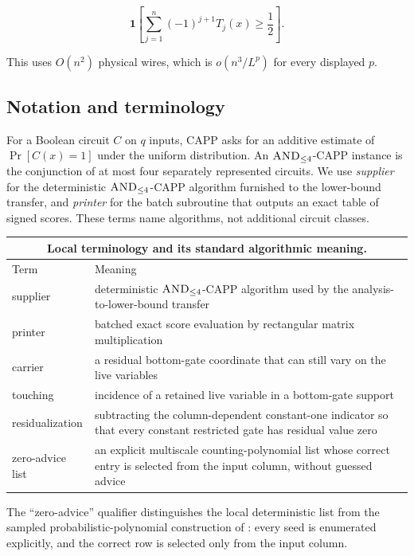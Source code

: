 \documentclass[11pt,letterpaper]{article}
\theoremstyle{definition}
\theoremstyle{remark}
\newcommand{\CAPP}{\textsc{CAPP}}
\newcommand{\ANDfour}{\textsc{AND}_{\le 4}}
\begin{document}
\[
\mathbf1\left[
\sum_{j=1}^n(-1)^{j+1}T_j(x)
\ge\frac12
\right].
\]

This uses \(O(n^2)\) physical wires, which is \(o(n^3/L^p)\) for every
displayed \(p\).

\subsection{Notation and terminology}\label{sec:notation}

For a Boolean circuit \(C\) on \(q\) inputs, \CAPP{} asks for an additive
estimate of \(\Pr[C(x)=1]\) under the uniform distribution. An
\(\ANDfour\)-\CAPP{} instance is the conjunction of at most four separately
represented circuits. We use \emph{supplier} for the deterministic
\(\ANDfour\)-\CAPP{} algorithm furnished to the lower-bound transfer, and
\emph{printer} for the batch subroutine that outputs an exact table of signed
scores. These terms name algorithms, not additional circuit classes.

\begin{center}
\small
\begin{tabularx}{\textwidth}{@{}p{}X@{}}
\multicolumn{2}{c}{\textbf{Local terminology and its standard algorithmic
meaning.}}\\[0.4em]
\toprule
Term & Meaning \\
\midrule
supplier & deterministic \(\ANDfour\)-\CAPP{} algorithm used by the
analysis-to-lower-bound transfer \\
printer & batched exact score evaluation by rectangular matrix
multiplication \\
carrier & a residual bottom-gate coordinate that can still vary on the live
variables \\
touching & incidence of a retained live variable in a bottom-gate support \\
residualization & subtracting the column-dependent constant-one indicator so
that every constant restricted gate has residual value zero \\
zero-advice list & an explicit multiscale counting-polynomial list whose
correct entry is selected from the input column, without guessed advice \\
\bottomrule
\end{tabularx}
\end{center}

The ``zero-advice'' qualifier distinguishes the local deterministic list from
the sampled probabilistic-polynomial construction of \cite{AW15}: every seed
is enumerated explicitly, and the correct row is selected only from the input
column.
\end{document}
